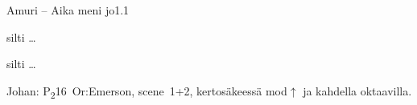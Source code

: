 \documentclass[12pt,a4paper]{article}
\begin{document}
\begin{mysong}{Amuri – Aika meni jo}{1.1}
\begin{SBChorus}
   silti    
    \ldots{}

   silti    
    \ldots{}
\end{SBChorus}


{\SBLyricNoteFont Johan: P\textsubscript{2}16~Or:Emerson, scene~1+2,
kertosäkeessä mod$\uparrow$ ja kahdella oktaavilla.}

\end{mysong}
\end{document}
